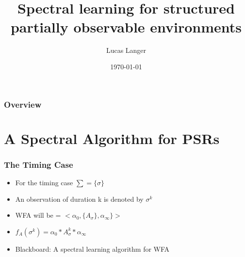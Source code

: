 \documentclass{beamer}
\title[Spectral learning with structure]{Spectral learning for structured partially observable environments} %
\author{Lucas Langer} %
\institute[McGill University] %
{
McGill University \\ %
\medskip
\textit{lucas.langer@mail.mcgill.ca} %
}
\date{\today} %
\begin{document}
\begin{frame}
\titlepage %
\end{frame}

\begin{frame}
\frametitle{Overview} %
\tableofcontents %
\end{frame}


\section{A Spectral Algorithm for PSRs} %



\begin{frame}
\frametitle{The Timing Case}

\begin{itemize}
\item For the timing case $\sum = \{\sigma\}$
\item An observation of duration k is denoted by $\sigma^k$
\item WFA will be = $<\alpha_0, \{A_\sigma\},\alpha_\infty\}>$
\item $f_A(\sigma^k) = \alpha_0*A_\sigma^k*\alpha_\infty$
\item Blackboard: A spectral learning algorithm for WFA 
\end{itemize}

\end{frame}
\end{document}
